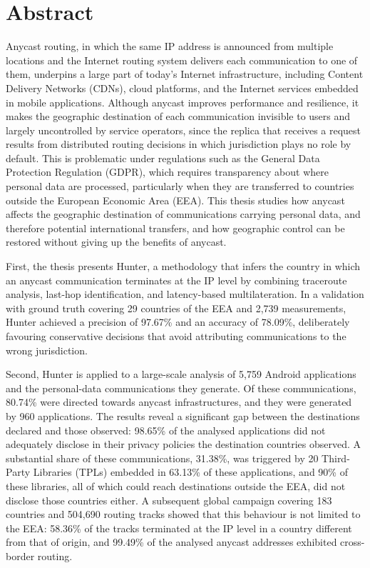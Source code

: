 %

\section*{Abstract}
\label{sec::abstract}

Anycast routing, in which the same IP address is announced from multiple locations and the Internet routing system delivers each communication to one of them, underpins a large part of today's Internet infrastructure, including Content Delivery Networks (CDNs), cloud platforms, and the Internet services embedded in mobile applications. Although anycast improves performance and resilience, it makes the geographic destination of each communication invisible to users and largely uncontrolled by service operators, since the replica that receives a request results from distributed routing decisions in which jurisdiction plays no role by default. This is problematic under regulations such as the General Data Protection Regulation (GDPR), which requires transparency about where personal data are processed, particularly when they are transferred to countries outside the European Economic Area (EEA). This thesis studies how anycast affects the geographic destination of communications carrying personal data, and therefore potential international transfers, and how geographic control can be restored without giving up the benefits of anycast.

First, the thesis presents Hunter, a methodology that infers the country in which an anycast communication terminates at the IP level by combining traceroute analysis, last-hop identification, and latency-based multilateration. In a validation with ground truth covering 29 countries of the EEA and 2,739 measurements, Hunter achieved a precision of 97.67\% and an accuracy of 78.09\%, deliberately favouring conservative decisions that avoid attributing communications to the wrong jurisdiction.

Second, Hunter is applied to a large-scale analysis of 5,759 Android applications and the personal-data communications they generate. Of these communications, 80.74\% were directed towards anycast infrastructures, and they were generated by 960 applications. The results reveal a significant gap between the destinations declared and those observed: 98.65\% of the analysed applications did not adequately disclose in their privacy policies the destination countries observed. A substantial share of these communications, 31.38\%, was triggered by 20 Third-Party Libraries (TPLs) embedded in 63.13\% of these applications, and 90\% of these libraries, all of which could reach destinations outside the EEA, did not disclose those countries either. A subsequent global campaign covering 183 countries and 504,690 routing tracks showed that this behaviour is not limited to the EEA: 58.36\% of the tracks terminated at the IP level in a country different from that of origin, and 99.49\% of the analysed anycast addresses exhibited cross-border routing.

